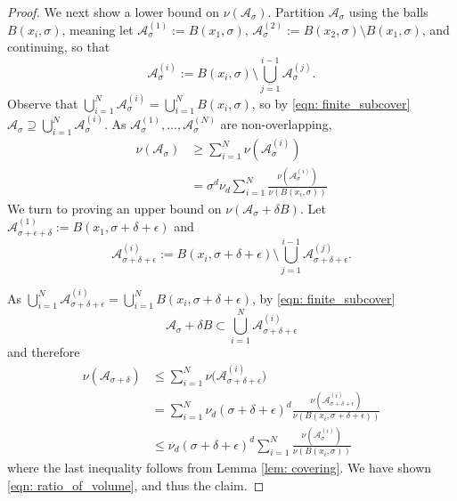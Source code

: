 \documentclass{article}
\newcommand{\1}{\mathbf{1}}
\newcommand{\Aset}{\mathcal{A}}
\newcommand{\Asig}{\Aset_{\sigma}}
\theoremstyle{aldenthm}
\begin{document}
\begin{proof}
	We next show a lower bound on $\nu(\Asig)$. Partition $\Asig$ using the balls $B(x_i,\sigma)$, meaning let $\Aset_{\sigma}^{(1)} := B(x_1,\sigma)$, $\Aset_{\sigma}^{(2)} := B(x_2,\sigma) \setminus B(x_1,\sigma)$, and continuing, so that
	\begin{equation*}
	\Aset_{\sigma}^{(i)} := B(x_i,\sigma) \setminus \bigcup_{j = 1}^{i - 1} \Aset_{\sigma}^{(j)}. \tag{$i = 1,\ldots,N$}
	\end{equation*}
	Observe that $\bigcup_{i = 1}^{N} \Asig^{(i)} = \bigcup_{i = 1}^{N} B(x_i,\sigma)$, so by \eqref{eqn: finite_subcover} $\Asig \supseteq \bigcup_{i = 1}^{N} \Asig^{(i)}$. As $\Asig^{(1)},\ldots, \Asig^{(N)}$ are non-overlapping,
	\begin{align*}
	\nu(\Asig) & \geq \sum_{i = 1}^{N} \nu(\Asig^{(i)}) \\
	& = \sigma^d \nu_d \sum_{i = 1}^{N}  \frac{\nu(\Asig^{(i)})}{\nu(B(x_i,\sigma))}
	\end{align*}
	We turn to proving an upper bound on $\nu(\Asig + \delta B)$. Let $\Aset_{\sigma + \epsilon + \delta}^{(1)} := B(x_1,\sigma + \delta + \epsilon)$ and
	\begin{equation*}
	\Aset_{\sigma + \delta + \epsilon}^{(i)} := B(x_i,\sigma + \delta + \epsilon) \setminus \bigcup_{j = 1}^{i - 1} \Aset_{\sigma + \delta + \epsilon}^{(j)}. \tag{$i = 2,\ldots,N$}
	\end{equation*}
	
	As $\bigcup_{i = 1}^{N} \Aset_{\sigma + \delta + \epsilon}^{(i)} = \bigcup_{i = 1}^{N} B(x_i,\sigma + \delta + \epsilon)$, by \eqref{eqn: finite_subcover}
	\begin{equation*}
	\Aset_{\sigma} + \delta B \subset \bigcup_{i =1}^{N} \Aset_{\sigma + \delta + \epsilon}^{(i)}
	\end{equation*}
	and therefore
	\begin{align*}
	\nu(\Aset_{\sigma + \delta}) & \leq \sum_{i = 1}^{N} \nu\bigl(\Aset_{\sigma + \delta + \epsilon}^{(i)}\bigr) \\
	& = \sum_{i = 1}^{N} \nu_d (\sigma + \delta + \epsilon)^d \frac{\nu(\Aset_{\sigma + \delta + \epsilon}^{(i)})}{\nu(B(x_i, \sigma + \delta + \epsilon))} \\
	& \leq \nu_d (\sigma + \delta + \epsilon)^d \sum_{i = 1}^{N} \frac{\nu(\Asig^{(i)})}{\nu(B(x_i,\sigma))}
	\end{align*}
	where the last inequality follows from Lemma \ref{lem: covering}. We have shown \eqref{eqn: ratio_of_volume}, and thus the claim.
\end{proof}
\end{document}
